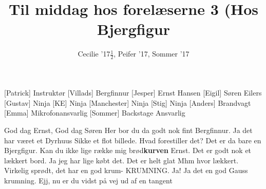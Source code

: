 \documentclass[a4paper,11pt]{article}
\title{Til middag hos forelæserne 3 (Hos Bjergfigur}
\author{Cecilie '17$\frac{1}{2}$, Peifer '17, Sommer '17}
\begin{document}
\maketitle

\begin{roles}
[Patrick] Instruktør
[Villads] Bergfinnur
[Jesper] Ernst Hansen
[Eigil] Søren Eilers
[Gustav] Ninja
[KE] Ninja
[Manchester] Ninja
[Stig] Ninja
[Anders] Brandvagt
[Emma] Mikrofonansvarlig
[Sommer] Backstage Ansvarlig
\end{roles}

\begin{sketch}

 God dag Ernst, God dag Søren
 Her bor du da godt nok fint Bergfinnur.
 Ja det har været et Dyrhuus
 Sikke et flot billede. Hvad forestiller det?
 Det er da bare en Bjergfigur.
 Kan du ikke lige række mig brød\textbf{kurven} Ernst.
 Det er godt nok et lækkert bord.
 Ja jeg har lige købt det. Det er helt glat
 Mhm hvor lækkert. Virkelig sprødt, det har en god krum-
 KRUMNING. Ja! Ja det en god Gauss krumning. 
 Ejj, nu er du vidst på vej ud af en tangent


\end{sketch}
\end{document}
